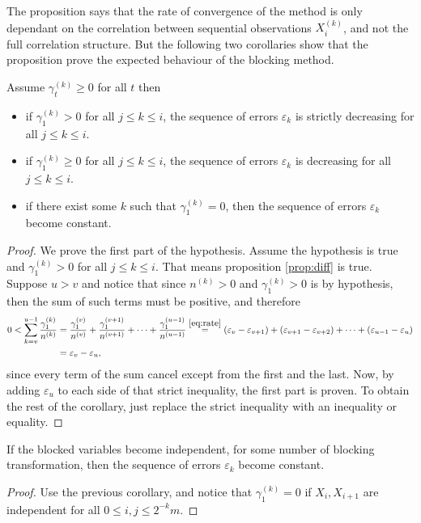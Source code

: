 \documentclass[11pt,english,a4paper]{article}
\begin{document}
The proposition says that the rate of convergence of the method is only dependant on the correlation between sequential observations $X_i^{(k)}$, and not the full correlation structure. But the following two corollaries show that the proposition prove the expected behaviour of the blocking method.
\begin{corollary}
Assume $\gamma^{(k)}_t \geq 0$ for all $t$ then
\begin{itemize}
\item if $\gamma^{(k)}_1 > 0$ for all $j \leq k \leq i$, the sequence of errors $\varepsilon_k$ is strictly decreasing for all $j \leq k \leq i$.
\item if $\gamma^{(k)}_1 \geq 0$ for all $j \leq k \leq i$, the sequence of errors $\varepsilon_k$ is decreasing for all $j \leq k \leq i$.
\item if there exist some $k$ such that $\gamma^{(k)}_1 = 0$, then the sequence of errors $\varepsilon_k$ become constant.
\end{itemize}
\end{corollary}
\begin{proof}
We prove the first part of the hypothesis. Assume the hypothesis is true and $\gamma^{(k)}_1 > 0$ for all $j \leq k \leq i$. That means proposition \ref{prop:diff} is true. Suppose $u>v$ and notice that since $n^{(k)} > 0$ and $\gamma^{(k)}_1 > 0$ is by hypothesis, then the sum of such terms must be positive, and therefore
\begin{align*}
0 < \sum_{k = v}^{u-1} \frac{\gamma^{(k)}_1 }{n^{(k)}} &= \frac{\gamma^{(v)}_1}{n^{(v)}} + \frac{\gamma^{(v+1)}_1}{n^{(v+1)}} + \cdots + \frac{\gamma^{(u-1)}_1}{n^{(u-1)}} \stackrel{\eqref{eq:rate}}{=} (\varepsilon_v - \varepsilon_{v+1}) + (\varepsilon_{v+1} - \varepsilon_{v+2}) + \cdots + (\varepsilon_{u-1} - \varepsilon_{u}) \\
&= \varepsilon_v - \varepsilon_{u},
\end{align*}
since every term of the sum cancel except from the first and the last. Now, by adding $\varepsilon_u$ to each side of that strict inequality, the first part is proven. To obtain the rest of the corollary, just replace the strict inequality with an inequality or equality.
\end{proof}

\begin{corollary}
If the blocked variables become independent, for some number of blocking transformation, then the sequence of errors $\varepsilon_k$ become constant.
\end{corollary}
\begin{proof}
Use the previous corollary, and notice that $\gamma^{(k)}_1 = 0$ if $X_i,X_{i+1}$ are independent for all $0 \leq i,j \leq 2^{-k}m$.
\end{proof}
\end{document}
